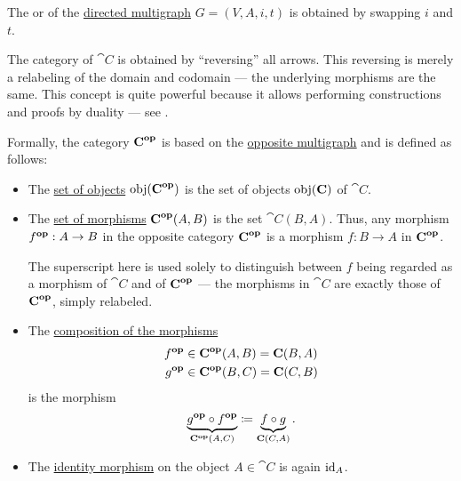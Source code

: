 \begin{definition}\label{def:opposite_directed_multigraph}
  The  or  of the \hyperref[def:directed_multigraph]{directed multigraph} \( G = (V, A, i, t) \) is obtained by swapping \( i \) and \( t \).
\end{definition}

\begin{definition}\label{def:opposite_category}
  The  category of \( \cat{C} \) is obtained by \enquote{reversing} all arrows. This reversing is merely a relabeling of the domain and codomain --- the underlying morphisms are the same. This concept is quite powerful because it allows performing constructions and proofs by duality --- see .

  Formally, the category \( \cat{C}^\oppos \) is based on the \hyperref[def:opposite_directed_multigraph]{opposite multigraph} and is defined as follows:
  \begin{itemize}
    \item The \hyperref[def:category/objects]{set of objects} \( \obj(\cat{C}^\oppos) \) is the set of objects \( \obj(\cat{C}) \) of \( \cat{C} \).

    \item The \hyperref[def:category/morphisms]{set of morphisms} \( \cat{C}^\oppos(A, B) \) is the set \( \cat{C}(B, A) \). Thus, any morphism \( f^\oppos: A \to B \) in the opposite category \( \cat{C}^\oppos \) is a morphism \( f: B \to A \) in \( \cat{C}^\oppos \).

    The superscript here is used solely to distinguish between \( f \) being regarded as a morphism of \( \cat{C} \) and of \( \cat{C}^\oppos \) --- the morphisms in \( \cat{C} \) are exactly those of \( \cat{C}^\oppos \), simply relabeled.

    \item The \hyperref[def:category/composition]{composition of the morphisms}
    \begin{align*}
      f^\oppos &\in \cat{C}^\oppos(A, B) = \cat{C}(B, A) \\
      g^\oppos &\in \cat{C}^\oppos(B, C) = \cat{C}(C, B)
    \end{align*}
    is the morphism
    \begin{equation*}
      \underbrace{g^\oppos \bincirc f^\oppos}_{\cat{C}^\oppos(A, C)} \coloneqq \underbrace{f \bincirc g}_{\cat{C}(C, A)}.
    \end{equation*}

    \item The \hyperref[def:category/identity]{identity morphism} on the object \( A \in \cat{C} \) is again \( \operatorname{id}_A \).
  \end{itemize}
\end{definition}


